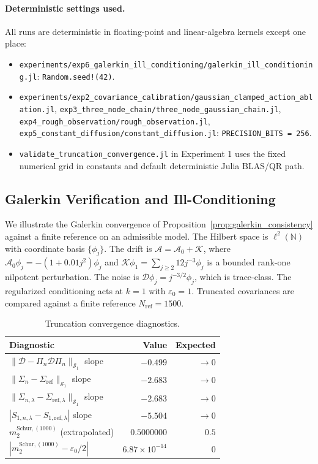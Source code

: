 \paragraph{Deterministic settings used.}
All runs are deterministic in floating-point and linear-algebra kernels except
one place:
\begin{itemize}
    \item \texttt{experiments/exp6\_galerkin\_ill\_conditioning/galerkin\_ill\_conditioning.jl}:
    \texttt{Random.seed!(42)}.
    \item \texttt{experiments/exp2\_covariance\_calibration/gaussian\_clamped\_action\_ablation.jl},
    \texttt{exp3\_three\_node\_chain/three\_node\_gaussian\_chain.jl},
    \texttt{exp4\_rough\_observation/rough\_observation.jl},
    \texttt{exp5\_constant\_diffusion/constant\_diffusion.jl}:
    \texttt{PRECISION\_BITS = 256}.
    \item \texttt{validate\_truncation\_convergence.jl} in Experiment 1 uses the
    fixed numerical grid in constants and default deterministic Julia BLAS/QR path.
\end{itemize}

\subsection{Galerkin Verification and Ill-Conditioning}
\label{supp:galerkin_verification}

We illustrate the Galerkin convergence of
Proposition~\ref{prop:galerkin_consistency} against a finite reference on an
admissible model. The Hilbert space is $\ell^2(\mathbb{N})$ with coordinate
basis $\{\phi_j\}$. The drift is
$\mathcal{A}=\mathcal{A}_0+\mathcal{K}$, where
$\mathcal{A}_0\phi_j=-(1+0.01j^2)\phi_j$ and
$\mathcal{K}\phi_1=\sum_{j\ge2}12j^{-3}\phi_j$ is a bounded rank-one nilpotent
perturbation. The noise is $\mathcal{D}\phi_j=j^{-3/2}\phi_j$, which is
trace-class. The regularized conditioning acts at $k=1$ with
$\varepsilon_0=1$. Truncated covariances are compared against a finite
reference $N_{\mathrm{ref}}=1500$.

\begin{table}[htbp]
  \centering
  \caption{Truncation convergence diagnostics.}
  \label{tab:supp_truncation}
  \begin{tabular}{lrr}
    \toprule
    Diagnostic & Value & Expected \\
    \midrule
    $\|\mathcal{D}-\Pi_n\mathcal{D}\Pi_n\|_{\mathcal{S}_1}$ slope & $-0.499$ & $\to0$ \\
    $\|\Sigma_n-\Sigma_{\mathrm{ref}}\|_{\mathcal{S}_1}$ slope & $-2.683$ & $\to0$ \\
    $\|\Sigma_{n,\lambda}-\Sigma_{\mathrm{ref},\lambda}\|_{\mathcal{S}_1}$ slope & $-2.683$ & $\to0$ \\
    $|S_{1,n,\lambda}-S_{1,\mathrm{ref},\lambda}|$ slope & $-5.504$ & $\to0$ \\
    $m_2^{\mathrm{Schur},(1000)}$ (extrapolated) & $0.5000000$ & $0.5$ \\
    $|m_2^{\mathrm{Schur},(1000)}-\varepsilon_0/2|$ & $6.87\times10^{-14}$ & $0$ \\
    \bottomrule
  \end{tabular}
\end{table}

